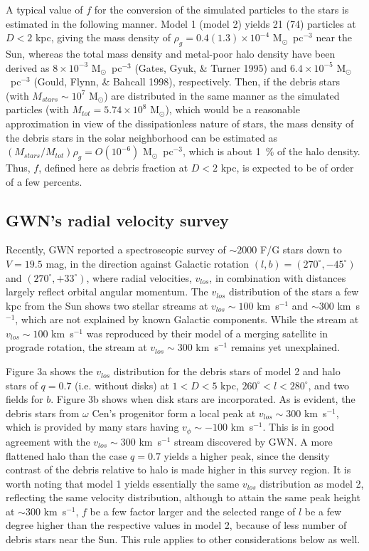 \documentclass[preprint,12pt]{aastex}
\begin{document}
A typical value of $f$ for the conversion of the simulated particles to
the stars is estimated in the following manner. Model 1 (model 2) yields
21 (74) particles at $D < 2$ kpc, giving the mass density of
$\rho_g = 0.4 (1.3) \times 10^{-4}$ M$_\odot$~pc$^{-3}$ near
the Sun, whereas the total mass density and
metal-poor halo density have been derived as
$8 \times 10^{-3}$ M$_\odot$~pc$^{-3}$ (Gates, Gyuk, \& Turner 1995) and
$6.4 \times 10^{-5}$ M$_\odot$~pc$^{-3}$ (Gould, Flynn, \& Bahcall 1998),
respectively.
Then, if the debris stars (with $M_{stars} \sim 10^7$ M$_\odot$)
are distributed in the same manner as the simulated particles (with
$M_{tot} =5.74 \times 10^8$ M$_\odot$), which would be a reasonable
approximation in view of the dissipationless nature of stars,
the mass density of the debris stars in the solar neighborhood can be
estimated as $(M_{stars}/M_{tot}) \rho_g = O(10^{-6})$
M$_\odot$~pc$^{-3}$, which is about 1~\% of the halo density.
Thus, $f$, defined here as debris fraction at $D<2$ kpc,
is expected to be of order of a few percents.


\subsection{GWN's radial velocity survey}

Recently, GWN reported a spectroscopic survey of
$\sim 2000$ F/G stars down to $V = 19.5$ mag, in the direction
against Galactic rotation $(l,b)=(270^\circ,-45^\circ)$ and $(270^\circ,
+33^\circ)$, where radial velocities, $v_{los}$, in combination with distances
largely reflect orbital angular momentum. The $v_{los}$ distribution of the
stars a few kpc from the Sun shows two stellar streams
at $v_{los}\sim 100$ km~s$^{-1}$ and $\sim 300$ km~s$^{-1}$, which are not
explained by known Galactic components.
While the stream at $v_{los} \sim 100$ km~s$^{-1}$ was reproduced by
their model of a merging satellite in prograde rotation,
the stream at $v_{los}\sim 300$ km~s$^{-1}$ remains yet unexplained.

Figure 3a shows the $v_{los}$ distribution for the
debris stars of model 2 and halo stars of $q=0.7$ (i.e. without disks)
at $1<D<5$ kpc, $260^\circ<l<280^\circ$, and two fields for $b$.
Figure 3b shows when disk stars are incorporated. As is evident,
the debris stars from $\omega$ Cen's progenitor form a local peak
at $v_{los}\sim 300$ km~s$^{-1}$, which is provided by many stars having
$v_\phi \sim -100$ km~s$^{-1}$. This is in good
agreement with the $v_{los}\sim 300$ km~s$^{-1}$ stream discovered by GWN.
A more flattened halo than the case $q=0.7$ yields a higher peak,
since the density contrast of
the debris relative to halo is made higher in this survey region.
It is worth noting that model 1 yields essentially the same $v_{los}$
distribution as model 2, reflecting the same velocity distribution,
although to attain the same peak height at $\sim 300$ km~s$^{-1}$,
$f$ be a few factor larger and the selected range of $l$ be a few degree
higher than the respective values in model 2, because of less number of
debris stars near the Sun. This rule applies to other considerations
below as well.
\end{document}
